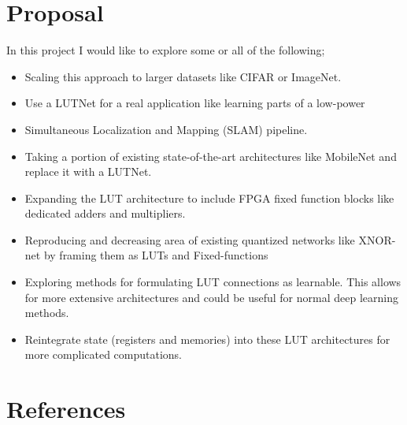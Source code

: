 \documentclass{article}
\begin{document}
\section{Proposal}
In this project I would like to explore some or all of the following;
\begin{itemize}
\item Scaling this approach to larger datasets like CIFAR or ImageNet.
\item Use a LUTNet for a real application like learning parts of a low-power
\item Simultaneous Localization and Mapping (SLAM) pipeline.
\item Taking a portion of existing state-of-the-art architectures like MobileNet and replace it with a LUTNet.
\item Expanding the LUT architecture to include FPGA fixed function blocks like dedicated adders and multipliers. 
\item Reproducing and decreasing area of existing quantized networks like XNOR-net by framing them as LUTs and Fixed-functions
\item Exploring methods for formulating LUT connections as learnable. This allows for more extensive architectures and could be useful for normal deep learning methods. 
\item Reintegrate state (registers and memories) into these LUT architectures for more complicated computations. 
\end{itemize}


\section*{References}

\medskip



%
%
%

{}


%
%
%
\end{document}
